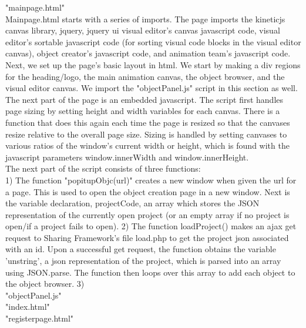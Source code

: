 \documentclass[12pt]{article}
\begin{document}
"mainpage.html" \\

Mainpage.html starts with a series of imports. The page imports the kineticjs canvas library, jquery, jquery ui visual editor's canvas javascript code, visual editor's sortable javascript code (for sorting visual code blocks in the visual editor canvas), object creator's javascript code, and animation team's javascript code. \\

Next, we set up the page's basic layout in html. We start by making a div regions for the heading/logo, the main animation canvas, the object browser, and the visual editor canvas. We import the "objectPanel.js" script in this section as well. \\

The next part of the page is an embedded javascript. The script first handles page sizing by setting height and width variables for each canvas. There is a function that does this again each time the page is resized so that the canvases resize relative to the overall page size. Sizing is handled by setting canvases to various ratios of the window's current width or height, which is found with the javascript parameters window.innerWidth and window.innerHeight. \\

The next part of the script consists of three functions: \\

1) The function "popitupObjc(url)" creates a new window when given the url for a page. This is used to open the object creation page in a new window. Next is the variable declaration, projectCode, an array which stores the JSON representation of the currently open project (or an empty array if no project is open/if a project fails to open). 2) The function loadProject() makes an ajax get request to Sharing Framework's file load.php to get the project json associated with an id. Upon a successful get request, the function obtains the variable 'unstring', a json representation of the project, which is parsed into an array using JSON.parse. The function then loops over this array to add each object to the object browser. 3) \\

"objectPanel.js" \\

"index.html" \\

"registerpage.html" \\
\end{document}
